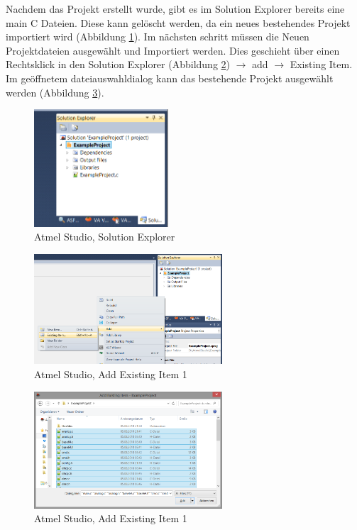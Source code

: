 Nachdem das Projekt erstellt wurde, gibt es im Solution Explorer
bereits eine main C Dateien. Diese kann gelöscht werden, da ein
neues bestehendes Projekt importiert wird (Abbildung \ref{new.explorer}).
Im nächsten schritt müssen die Neuen Projektdateien ausgewählt und Importiert
werden. Dies geschieht über einen Rechtsklick in den Solution Explorer
(Abbildung \ref{new.addExisting1}) $\to$ add $\to$ Existing Item. Im geöffnetem
dateiauswahldialog kann das bestehende Projekt ausgewählt werden (Abbildung
\ref{new.addExisting2}).

\begin{figure}[htp]
\begin{center}
  \includegraphics[width=5cm]{content/pictures/Import/3solutionExplorer.png}
  \caption{Atmel Studio, Solution Explorer}
  \label{new.explorer}
\end{center}
\end{figure}

\begin{figure}[htp]
\begin{center}
  \includegraphics[width=7cm]{content/pictures/Import/4addExisting1.png}
  \caption{Atmel Studio, Add Existing Item 1}
  \label{new.addExisting1}
\end{center}
\end{figure}

\begin{figure}[htp]
\begin{center}
  \includegraphics[width=7cm]{content/pictures/Import/5addExisting2.png}
  \caption{Atmel Studio, Add Existing Item 1}
  \label{new.addExisting2}
\end{center}
\end{figure}

